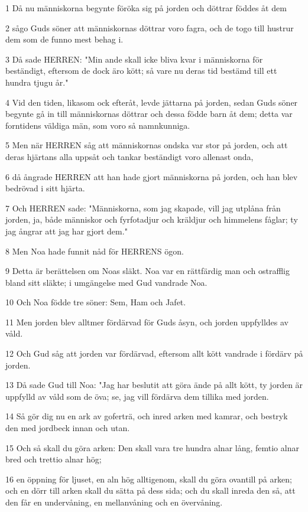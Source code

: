 \par 1 Då nu människorna begynte föröka sig på jorden och döttrar föddes åt dem
\par 2 sågo Guds söner att människornas döttrar voro fagra, och de togo till hustrur dem som de funno mest behag i.
\par 3 Då sade HERREN: "Min ande skall icke bliva kvar i människorna för beständigt, eftersom de dock äro kött; så vare nu deras tid bestämd till ett hundra tjugu år."
\par 4 Vid den tiden, likasom ock efteråt, levde jättarna på jorden, sedan Guds söner begynte gå in till människornas döttrar och dessa födde barn åt dem; detta var forntidens väldiga män, som voro så namnkunniga.
\par 5 Men när HERREN såg att människornas ondska var stor på jorden, och att deras hjärtans alla uppsåt och tankar beständigt voro allenast onda,
\par 6 då ångrade HERREN att han hade gjort människorna på jorden, och han blev bedrövad i sitt hjärta.
\par 7 Och HERREN sade: "Människorna, som jag skapade, vill jag utplåna från jorden, ja, både människor och fyrfotadjur och kräldjur och himmelens fåglar; ty jag ångrar att jag har gjort dem."
\par 8 Men Noa hade funnit nåd för HERRENS ögon.
\par 9 Detta är berättelsen om Noas släkt. Noa var en rättfärdig man och ostrafflig bland sitt släkte; i umgängelse med Gud vandrade Noa.
\par 10 Och Noa födde tre söner: Sem, Ham och Jafet.
\par 11 Men jorden blev alltmer fördärvad för Guds åsyn, och jorden uppfylldes av våld.
\par 12 Och Gud såg att jorden var fördärvad, eftersom allt kött vandrade i fördärv på jorden.
\par 13 Då sade Gud till Noa: "Jag har beslutit att göra ände på allt kött, ty jorden är uppfylld av våld som de öva; se, jag vill fördärva dem tillika med jorden.
\par 14 Så gör dig nu en ark av goferträ, och inred arken med kamrar, och bestryk den med jordbeck innan och utan.
\par 15 Och så skall du göra arken: Den skall vara tre hundra alnar lång, femtio alnar bred och trettio alnar hög;
\par 16 en öppning för ljuset, en aln hög alltigenom, skall du göra ovantill på arken; och en dörr till arken skall du sätta på dess sida; och du skall inreda den så, att den får en undervåning, en mellanvåning och en övervåning.
